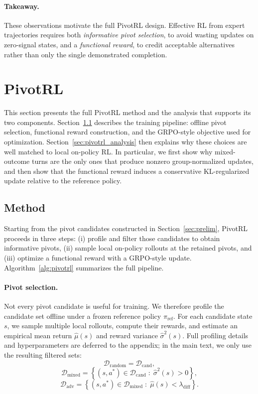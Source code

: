\paragraph{Takeaway.}
These observations motivate the full PivotRL design. Effective RL from expert trajectories requires both \emph{informative pivot selection}, to avoid wasting updates on zero-signal states, and a \emph{functional reward}, to credit acceptable alternatives rather than only the single demonstrated completion.

\section{PivotRL}
\label{sec:pivotrl}

This section presents the full PivotRL method and the analysis that supports its two components. Section~\ref{sec:pivotrl_method} describes the training pipeline: offline pivot selection, functional reward construction, and the GRPO-style objective used for optimization. Section~\ref{sec:pivotrl_analysis} then explains why these choices are well matched to local on-policy RL. In particular, we first show why mixed-outcome turns are the only ones that produce nonzero group-normalized updates, and then show that the functional reward induces a conservative KL-regularized update relative to the reference policy.

\subsection{Method}
\label{sec:pivotrl_method}

Starting from the pivot candidates constructed in Section~\ref{sec:prelim}, PivotRL proceeds in three steps: (i) profile and filter those candidates to obtain informative pivots, (ii) sample local on-policy rollouts at the retained pivots, and (iii) optimize a functional reward with a GRPO-style update. Algorithm~\ref{alg:pivotrl} summarizes the full pipeline.

\paragraph{Pivot selection.}
Not every pivot candidate is useful for training. We therefore profile the candidate set offline under a frozen reference policy $\pi_{\mathrm{ref}}$. For each candidate state $s$, we sample multiple local rollouts, compute their rewards, and estimate an empirical mean return $\hat{\mu}(s)$ and reward variance $\hat{\sigma}^2(s)$. Full profiling details and hyperparameters are deferred to the appendix; in the main text, we only use the resulting filtered sets:
\[
\mathcal{D}_{\mathrm{random}}=\mathcal{D}_{\mathrm{cand}},
\]
\[
\mathcal{D}_{\mathrm{mixed}}=\left\{(s,a^*)\in\mathcal{D}_{\mathrm{cand}} \;:\; \hat{\sigma}^2(s)>0\right\},
\]
\[
\mathcal{D}_{\mathrm{adv}}=\left\{(s,a^*)\in\mathcal{D}_{\mathrm{mixed}} \;:\; \hat{\mu}(s)<\lambda_{\mathrm{diff}}\right\}.
\]

